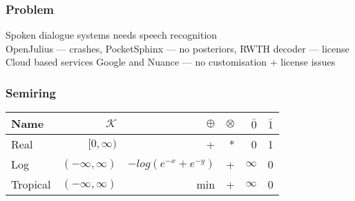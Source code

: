 \begin{frame}\frametitle{Problem} 
    Spoken dialogue systems needs speech recognition \\
    OpenJulius --- crashes, PocketSphinx --- no posteriors, RWTH decoder --- license \\
    Cloud based services Google and Nuance --- no customisation + license issues
\end{frame}

\begin{frame} \frametitle{Semiring}
\begin{tabular}{lrrrrr}
\hline
Name & $\mathcal{K}$ & $\oplus$ & $ \otimes$ & $\bar{0}$ & $\bar{1}$ \\ 
\hline
Real        & $[0,\infty)$        &  +                     &  * &  0        &  1  \\
Log         & $(-\infty, \infty)$ & $-log(e^{-x} + e^{-y})$ & + &  $\infty$ &  0  \\
Tropical    & $(-\infty, \infty)$ &  min                   &  + &  $\infty$ &  0  \\
\hline
\end{tabular}
\end{frame}

